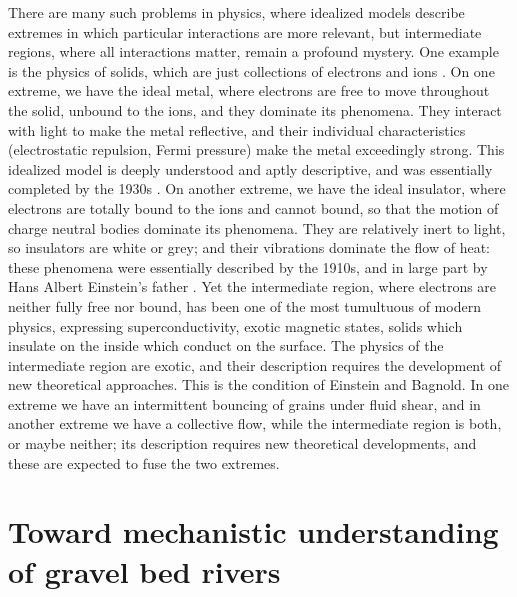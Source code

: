 \documentclass{article}
\begin{document}
There are many such problems in physics, where idealized models describe extremes in which particular interactions are more relevant, but intermediate regions, where all interactions matter, remain a profound mystery.
One example is the physics of solids, which are just collections of electrons and ions \citep{Ashcroft1986}.   
On one extreme, we have the ideal metal, where electrons are free to move throughout the solid, unbound to the ions, and they dominate its phenomena. 
They interact with light to make the metal reflective, and their individual characteristics (electrostatic repulsion, Fermi pressure) make the metal exceedingly strong. 
This idealized model is deeply understood and aptly descriptive, and was essentially completed by the 1930s \citep{Ashcroft1986}. 
On another extreme, we have the ideal insulator, where electrons are totally bound to the ions and cannot bound, so that the motion of charge neutral bodies dominate its phenomena. 
They are relatively inert to light, so insulators are white or grey; and their vibrations dominate the flow of heat: these phenomena were essentially described by the 1910s, and in large part by Hans Albert Einstein's father \citep{Ashcroft1986}. 
Yet the intermediate region, where electrons are neither fully free nor bound, has been one of the most tumultuous of modern physics, expressing superconductivity, exotic magnetic states, solids which insulate on the inside which conduct on the surface. 
The physics of the intermediate region are exotic, and their description requires the development of new theoretical approaches. 
This is the condition of Einstein and Bagnold. 
In one extreme we have an intermittent bouncing of grains under fluid shear, and in another extreme we have a collective flow, while the intermediate region is both, or maybe neither; its description requires new theoretical developments, and these are expected to fuse the two extremes.  



\section{Toward mechanistic understanding of gravel bed rivers} 
\end{document}
